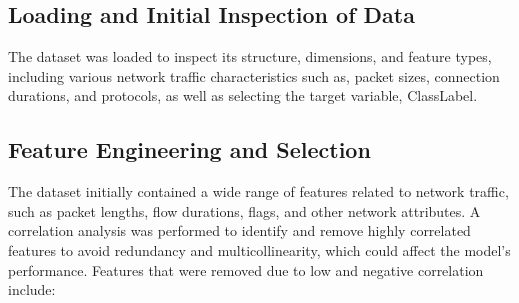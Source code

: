 \documentclass[conference]{IEEEtran}
\begin{document}
	\subsection{Loading and Initial Inspection of Data}
	The dataset was loaded to inspect its structure, dimensions, and feature types, including various network traffic characteristics such as, packet sizes, connection durations, and protocols, as well as selecting the target variable, ClassLabel.
	
	\subsection{Feature Engineering and Selection}
	The dataset initially contained a wide range of features related to network traffic, such as packet lengths, flow durations, flags, and other network attributes. A correlation analysis was performed to identify and remove highly correlated features to avoid redundancy and multicollinearity, which could affect the model's performance. Features that were removed due to low and negative correlation include:
\end{document}
